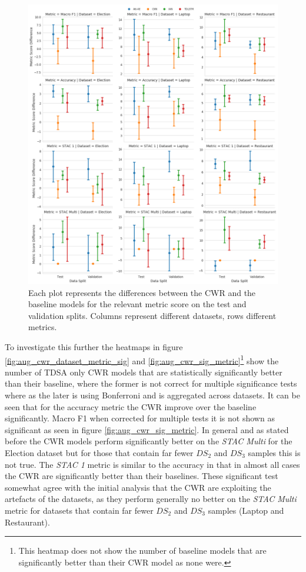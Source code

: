 \begin{figure}[!h]
    \centering
    \includegraphics[scale=0.4]{images/augmentation/methods_performance/CWR/overall_diff_cwr.png}
    \caption{Each plot represents the differences between the CWR and the baseline models for the relevant metric score on the test and validation splits. Columns represent different datasets, rows different metrics.}
    \label{fig:aug_overall_diff_cwr}
\end{figure}

To investigate this further the heatmaps in figure \ref{fig:aug_cwr_dataset_metric_sig} and \ref{fig:aug_cwr_sig_metric}\footnote{This heatmap does not show the number of baseline models that are significantly better than their CWR model as none were.} show the number of TDSA only CWR models that are statistically significantly better than their baseline, where the former is not correct for multiple significance tests where as the later is using Bonferroni and is aggregated across datasets. It can be seen that for the accuracy metric the CWR improve over the baseline significantly. Macro F1 when corrected for multiple tests it is not shown as significant as seen in figure \ref{fig:aug_cwr_sig_metric}. In general and as stated before the CWR models perform significantly better on the \textit{STAC Multi} for the Election dataset but for those that contain far fewer $DS_2$ and $DS_3$ samples this is not true. The \textit{STAC 1} metric is similar to the accuracy in that in almost all cases the CWR are significantly better than their baselines. These significant test somewhat agree with the initial analysis that the CWR are exploiting the artefacts of the datasets, as they perform generally no better on the \textit{STAC Multi} metric for datasets that contain far fewer $DS_2$ and $DS_3$ samples (Laptop and Restaurant).

